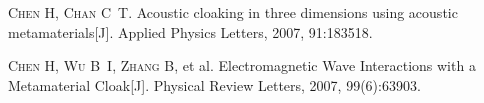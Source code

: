 \begin{publications}
    \item\textsc{Chen H, Chan C~T}. {Acoustic cloaking in three dimensions using acoustic metamaterials}[J]. Applied Physics Letters, 2007, 91:183518.
    \item\textsc{Chen H, Wu B~I, Zhang B}, et al. {Electromagnetic Wave Interactions with a Metamaterial Cloak}[J]. Physical Review Letters, 2007, 99(6):63903.
\end{publications}
